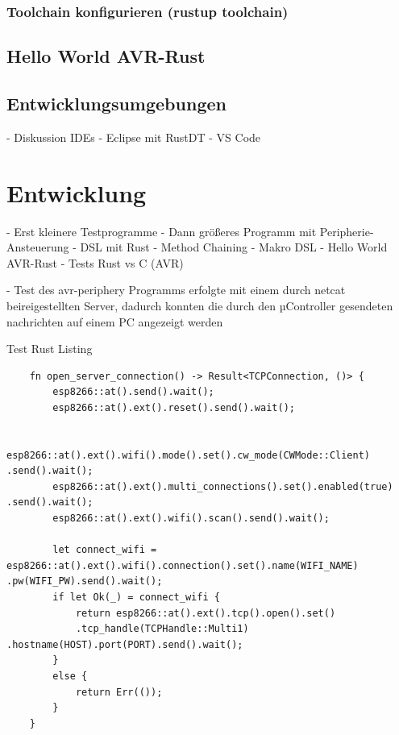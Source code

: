 \documentclass
[ 12pt,
  parskip=half %
]{scrreprt}
\newenvironment{mylisting}[1][H]
{\captionsetup{aboveskip=-0.2\normalbaselineskip}\begin{listing}[#1]}
	{\end{listing}}
\begin{document}
\subsection{Toolchain konfigurieren (rustup toolchain)}

\section{Hello World AVR-Rust}


\section{Entwicklungsumgebungen}

- Diskussion IDEs
	- Eclipse mit RustDT
	- VS Code
	

\chapter{Entwicklung}

- Erst kleinere Testprogramme
- Dann größeres Programm mit Peripherie-Ansteuerung
- DSL mit Rust
	- Method Chaining
	- Makro DSL
- Hello World AVR-Rust
- Tests Rust vs C (AVR)


- Test des avr-periphery Programms erfolgte mit einem durch netcat beireigestellten Server, dadurch konnten die durch den µController gesendeten nachrichten auf einem PC angezeigt werden
 
 
\begin{mylisting}[H]
	\caption{Test Rust Listing}
	\begin{verbatim}
	fn open_server_connection() -> Result<TCPConnection, ()> {
		esp8266::at().send().wait();
		esp8266::at().ext().reset().send().wait();

		esp8266::at().ext().wifi().mode().set().cw_mode(CWMode::Client) .send().wait();
		esp8266::at().ext().multi_connections().set().enabled(true) .send().wait();
		esp8266::at().ext().wifi().scan().send().wait();
		
		let connect_wifi = esp8266::at().ext().wifi().connection().set().name(WIFI_NAME) .pw(WIFI_PW).send().wait();
		if let Ok(_) = connect_wifi {
			return esp8266::at().ext().tcp().open().set()
			.tcp_handle(TCPHandle::Multi1) .hostname(HOST).port(PORT).send().wait();
		}
		else {
			return Err(());
		}
	}
	\end{verbatim}
\end{mylisting} 
\end{document}
